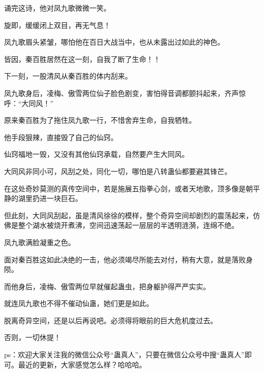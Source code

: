 \begin{this_body}
诵完这诗，他对凤九歌微微一笑。

旋即，缓缓闭上双目，再无气息！

凤九歌眉头紧皱，哪怕他在百日大战当中，也从未露出过如此的神色。

皆因，秦百胜居然在这一刻，自我了断了生命！！

下一刻，一股清风从秦百胜的体内刮来。

凤九歌身后，凌梅、傲雪两位仙子脸色剧变，害怕得音调都颤抖起来，齐声惊呼：“大同风！”

原来秦百胜为了拖住凤九歌一行，不惜舍弃生命，自我牺牲。

他手段狠辣，直接毁了自己的仙窍。

仙窍福地一毁，又没有其他仙窍承载，自然要产生大同风。

大同风非同小可，风刮之处，同化一切，哪怕是八转蛊仙都要避其锋芒。

在这处奇妙莫测的真传空间中，若是施展五指拳心剑，或者天地歌，顶多像是朝平静的湖里扔进一块巨石。

但此刻，大同风刮起，虽是清风徐徐的模样，整个奇异空间却剧烈的震荡起来，仿佛是整个湖水被烧开煮沸，空间迅速荡起一层层的半透明涟漪，连绵不绝。

凤九歌满脸凝重之色。

面对秦百胜这如此决绝的一击，他必须竭尽所能去对付，稍有大意，就是落败身陨。

而他身后，凌梅、傲雪两位早就催起蛊虫，把身躯护得严严实实。

就连凤九歌也不得不催动仙蛊，她们更是如此。

脱离奇异空间，还是以后再说吧。必须得将眼前的巨大危机度过去。

否则，一切休提！

ps：欢迎大家关注我的微信公众号“蛊真人”，只要在微信公众号中搜“蛊真人”即可。最近的更新，大家感觉怎么样？哈哈哈。

\end{this_body}

